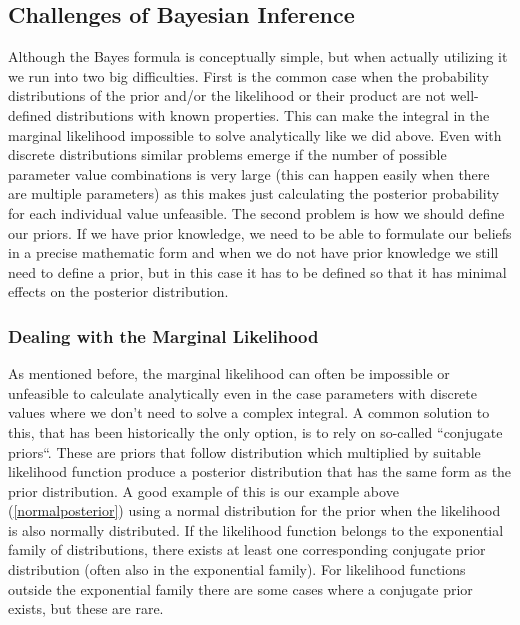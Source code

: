 \documentclass[12pt,a4paper,leqno]{report}
\theoremstyle{plain}
\theoremstyle{definition}
\theoremstyle{remark}
\begin{document}
\subsection{Challenges of Bayesian Inference}\label{bayesproblems}

Although the Bayes formula is conceptually simple, but when actually utilizing
it we run into two big difficulties. First is the common case when the
probability distributions of the prior and/or the likelihood or their product
are not well-defined distributions with known properties. This can make the
integral in the marginal likelihood impossible to solve analytically like we did
above. Even with discrete distributions similar problems emerge if the number of
possible parameter value combinations is very large (this can happen easily when
there are multiple parameters) as this makes just calculating the posterior
probability for each individual value unfeasible. The second problem is how we
should define our priors. If we have prior knowledge, we need to be able to
formulate our beliefs in a precise mathematic form and when we do not have prior knowledge we still
need to define a prior, but in this case it has to be defined so that it has
minimal effects on the posterior distribution.

\subsubsection{Dealing with the Marginal Likelihood}\label{bayesproblems}

As mentioned before, the marginal likelihood can often be impossible or
unfeasible to calculate analytically even in the case parameters with discrete
values where we don't need to solve a complex integral. A common solution to this,
that has been historically the only option, is to rely on so-called ``conjugate
priors``. These are priors that follow distribution which multiplied by
suitable likelihood function produce a posterior distribution that has the same
form as the prior distribution. A good example of this is our example above (\ref{normalposterior}) using a normal
distribution for the prior when the likelihood is also normally distributed. If
the likelihood function belongs to the exponential family of distributions, there
exists at least one corresponding conjugate prior distribution (often also in
the exponential family). For likelihood functions outside the exponential family
there are some cases where a conjugate prior exists, but these are rare.
\end{document}
